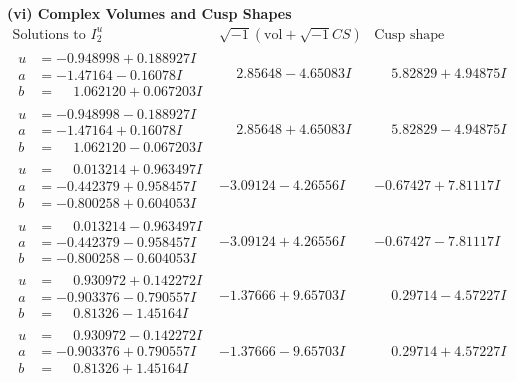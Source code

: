 \documentclass[1p]{elsarticle_modified}
\theoremstyle{definition}
\newcommand{\I}{\sqrt{-1}}
\begin{document}
\newpage\flushleft \textbf{(vi) Complex Volumes and Cusp Shapes}
$$\begin{array}{c|c|c}  
\text{Solutions to }I^u_{2}& \I (\text{vol} + \sqrt{-1}CS) & \text{Cusp shape}\\
 \hline 
\begin{aligned}
u &= -0.948998 + 0.188927 I \\
a &= -1.47164 - 0.16078 I \\
b &= \phantom{-}1.062120 + 0.067203 I\end{aligned}
 & \phantom{-}2.85648 - 4.65083 I & \phantom{-}5.82829 + 4.94875 I \\ \hline\begin{aligned}
u &= -0.948998 - 0.188927 I \\
a &= -1.47164 + 0.16078 I \\
b &= \phantom{-}1.062120 - 0.067203 I\end{aligned}
 & \phantom{-}2.85648 + 4.65083 I & \phantom{-}5.82829 - 4.94875 I \\ \hline\begin{aligned}
u &= \phantom{-}0.013214 + 0.963497 I \\
a &= -0.442379 + 0.958457 I \\
b &= -0.800258 + 0.604053 I\end{aligned}
 & -3.09124 - 4.26556 I & -0.67427 + 7.81117 I \\ \hline\begin{aligned}
u &= \phantom{-}0.013214 - 0.963497 I \\
a &= -0.442379 - 0.958457 I \\
b &= -0.800258 - 0.604053 I\end{aligned}
 & -3.09124 + 4.26556 I & -0.67427 - 7.81117 I \\ \hline\begin{aligned}
u &= \phantom{-}0.930972 + 0.142272 I \\
a &= -0.903376 - 0.790557 I \\
b &= \phantom{-}0.81326 - 1.45164 I\end{aligned}
 & -1.37666 + 9.65703 I & \phantom{-}0.29714 - 4.57227 I \\ \hline\begin{aligned}
u &= \phantom{-}0.930972 - 0.142272 I \\
a &= -0.903376 + 0.790557 I \\
b &= \phantom{-}0.81326 + 1.45164 I\end{aligned}
 & -1.37666 - 9.65703 I & \phantom{-}0.29714 + 4.57227 I \\ \hline\begin{aligned}

\end{aligned}
\end{array}$$
\end{document}
